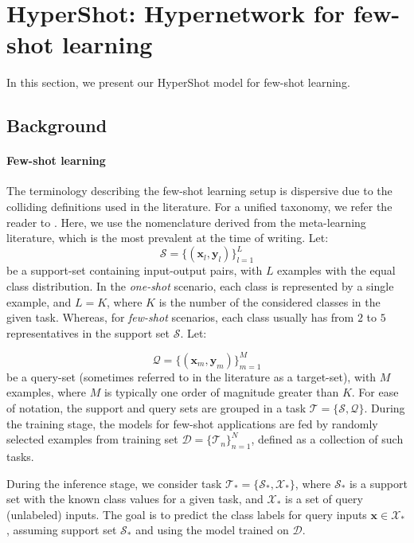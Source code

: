 \documentclass[nohyperref]{article}
\def\our{HyperShot}
\theoremstyle{plain}
\theoremstyle{definition}
\theoremstyle{remark}
\begin{document}
\section{\our{}: Hypernetwork for few-shot learning}

In this section, we present our \our{} model for few-shot learning. 

\subsection{Background}

\paragraph{Few-shot learning}
The terminology describing the few-shot learning setup is dispersive due to the colliding definitions used in the literature. For a unified taxonomy, we refer the reader to \cite{chen2019closer,wang2020fewshotsurvey}. 
Here, we use the nomenclature derived from the meta-learning literature, which is the most prevalent at the time of writing.
Let: 
\begin{equation}
\mathcal{S} = \{ (\mathbf{x}_l, \mathbf{y}_l) \}_{l=1}^L
\end{equation}
be a support-set containing input-output pairs, with $L$ examples with the equal class distribution. In the \textit{one-shot} scenario, each class is represented by a single example, and $L=K$, where $K$ is the number of the considered classes in the given task. Whereas, for \textit{few-shot} scenarios, each class usually has from $2$ to $5$ representatives in the support set $\mathcal{S}$. Let:

\begin{equation}
\mathcal{Q} = \{ (\mathbf{x}_m, \mathbf{y}_m) \}_{m=1}^M
\end{equation}
be a query-set (sometimes referred to in the literature as a target-set), with $M$ examples, where $M$ is typically one order of magnitude greater than $K$. For ease of notation, the support and query sets are grouped in a task $\mathcal{T} = \{\mathcal{S}, \mathcal{Q} \}$. During the training stage, the models for few-shot applications are fed by randomly selected examples from training set $\mathcal{D} = \{\mathcal{T}_n\}^N_{n=1}$,  defined as a collection of such tasks. 

 During the inference stage, we consider task $\mathcal{T}_{*} = \{\mathcal{S}_{*}, \mathcal{X}_{*}\}$, where $\mathcal{S}_{*}$ is a support set with the known class values for a given task, and $\mathcal{X}_{*}$ is a set of query (unlabeled) inputs. The goal is to predict the class labels for query inputs $\mathbf{x} \in \mathcal{X}_*$, assuming support set $\mathcal{S}_{*}$ and using the model trained on $\mathcal{D}$.
\end{document}
